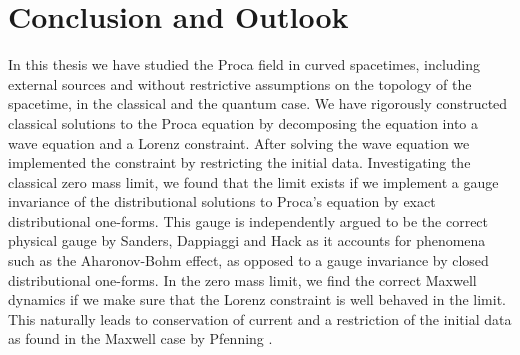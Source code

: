 \section{Conclusion and Outlook} \label{chpt::conclusion}
In this thesis we have studied the Proca field in curved spacetimes, including external sources and without restrictive assumptions on the topology of the spacetime, in the classical and the quantum case. We have rigorously constructed classical solutions to the Proca equation by decomposing the equation into a wave equation and a Lorenz constraint. After solving the wave equation we implemented the constraint by restricting the initial data. Investigating the classical zero mass limit, we found that the limit exists if we implement a gauge invariance of the distributional solutions to Proca's equation by exact distributional one-forms. This gauge is independently argued to be the correct physical gauge by Sanders, Dappiaggi and Hack \cite{Sanders} as it accounts for phenomena such as the Aharonov-Bohm effect, as opposed to a gauge invariance by closed distributional one-forms. In the zero mass limit, we find the correct Maxwell dynamics if we make sure that the Lorenz constraint is well behaved in the limit. This naturally leads to conservation of current and a restriction of the initial data as found in the Maxwell case by Pfenning \cite{pfenning}.\par
